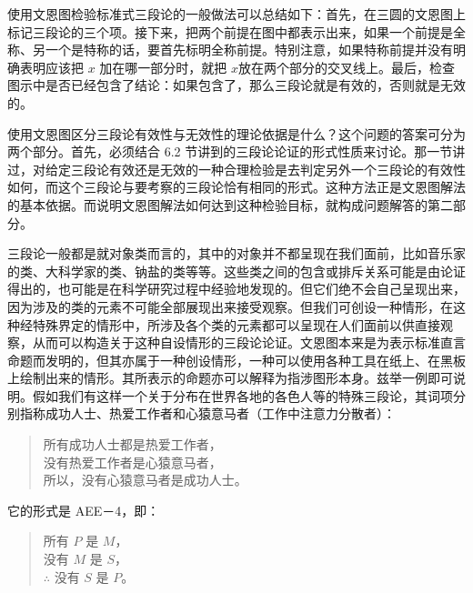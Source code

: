 使用文恩图检验标准式三段论的一般做法可以总结如下：首先，在三圆的文恩图上标记三段论的三个项。接下来，把两个前提在图中都表示出来，如果一个前提是全称、另一个是特称的话，要首先标明全称前提。特别注意，如果特称前提并没有明确表明应该把 $x$ 加在哪一部分时，就把 $x$放在两个部分的交叉线上。最后，检查图示中是否已经包含了结论：如果包含了，那么三段论就是有效的，否则就是无效的。

使用文恩图区分三段论有效性与无效性的理论依据是什么？这个问题的答案可分为两个部分。首先，必须结合 6.2 节讲到的三段论论证的形式性质来讨论。那一节讲过，对给定三段论有效还是无效的一种合理检验是去判定另外一个三段论的有效性如何，而这个三段论与要考察的三段论恰有相同的形式。这种方法正是文恩图解法的基本依据。而说明文恩图解法如何达到这种检验目标，就构成问题解答的第二部分。

三段论一般都是就对象类而言的，其中的对象并不都呈现在我们面前，比如音乐家的类、大科学家的类、钠盐的类等等。这些类之间的包含或排斥关系可能是由论证得出的，也可能是在科学研究过程中经验地发现的。但它们绝不会自己呈现出来，因为涉及的类的元素不可能全部展现出来接受观察。但我们可创设一种情形，在这种经特殊界定的情形中，所涉及各个类的元素都可以呈现在人们面前以供直接观察，从而可以构造关于这种自设情形的三段论论证。文恩图本来是为表示标准直言命题而发明的，但其亦属于一种创设情形，一种可以使用各种工具在纸上、在黑板上绘制出来的情形。其所表示的命题亦可以解释为指涉图形本身。兹举一例即可说明。假如我们有这样一个关于分布在世界各地的各色人等的特殊三段论，其词项分别指称成功人士、热爱工作者和心猿意马者（工作中注意力分散者）：

\begin{quote}
所有成功人士都是热爱工作者，\\
没有热爱工作者是心猿意马者，\\
所以，没有心猿意马者是成功人士。
\end{quote}

它的形式是 AEE－4，即：

\begin{quote}
所有 $P$ 是 $M$，\\
没有 $M$ 是 $S$，\\
$\therefore$ 没有 $S$ 是 $P$。
\end{quote}


